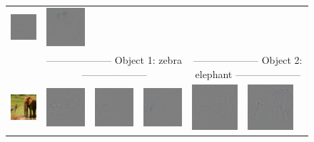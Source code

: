 \begin{figure}
\begin{center}
\begin{tabular}{ccccccc}
\includegraphics[width=0.14\linewidth,height=0.115\linewidth]{figs/examples/googlenet/deconv/bic-car2_diff_672} &
\includegraphics[width=0.14\linewidth,height=0.115\linewidth]{figs/examples/googlenet/soft/bic-car2_diff_672} \\
& \multicolumn{3}{c}{\small -------------------- Object 1: zebra --------------------} & \multicolumn{3}{c}{\small -------------------- Object 2: elephant --------------------} \\
\vspace{-2.5pt}
\includegraphics[width=0.14\linewidth,height=0.115\linewidth]{figs/examples/googlenet/oxford/zeb-ele1} &
\includegraphics[width=0.14\linewidth,height=0.115\linewidth]{figs/examples/googlenet/oxford/zeb-ele1_diff_341} &
\includegraphics[width=0.14\linewidth,height=0.115\linewidth]{figs/examples/googlenet/deconv/zeb-ele1_diff_341} &
\includegraphics[width=0.14\linewidth,height=0.115\linewidth]{figs/examples/googlenet/soft/zeb-ele1_diff_341} &
\includegraphics[width=0.14\linewidth,height=0.115\linewidth]{figs/examples/googlenet/oxford/zeb-ele1_diff_387} &
\includegraphics[width=0.14\linewidth,height=0.115\linewidth]{figs/examples/googlenet/deconv/zeb-ele1_diff_387} &

\end{tabular}
\end{center}
\end{figure}
